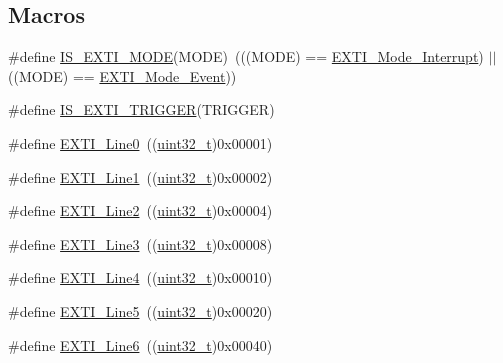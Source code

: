 \subsection*{Macros}
\begin{DoxyCompactItemize}
\item 
\#define \hyperlink{group___e_x_t_i___exported___types_ga8429170f3320b90227f9f5b252c1c5eb}{I\+S\+\_\+\+E\+X\+T\+I\+\_\+\+M\+O\+DE}(M\+O\+DE)~(((M\+O\+DE) == \hyperlink{group___e_x_t_i___exported___types_gad5e69af98dc0dfdf64417adc1cf57929a8c6ccdd7b1bc4872731306537e8c3b42}{E\+X\+T\+I\+\_\+\+Mode\+\_\+\+Interrupt}) $\vert$$\vert$ ((M\+O\+DE) == \hyperlink{group___e_x_t_i___exported___types_gad5e69af98dc0dfdf64417adc1cf57929aa38ef186929ec74786df79877ea124a7}{E\+X\+T\+I\+\_\+\+Mode\+\_\+\+Event}))
\item 
\#define \hyperlink{group___e_x_t_i___exported___types_gaee95ec6288944a6245696896604e509e}{I\+S\+\_\+\+E\+X\+T\+I\+\_\+\+T\+R\+I\+G\+G\+ER}(T\+R\+I\+G\+G\+ER)
\item 
\#define \hyperlink{group___e_x_t_i___lines_gac2a65680200dd5f4f7eab29cd4091a75}{E\+X\+T\+I\+\_\+\+Line0}~((\hyperlink{_p_e___types_8h_a33594304e786b158f3fb30289278f5af}{uint32\+\_\+t})0x00001)
\item 
\#define \hyperlink{group___e_x_t_i___lines_gae7c6ab2a0880ce3810641ee0585104cd}{E\+X\+T\+I\+\_\+\+Line1}~((\hyperlink{_p_e___types_8h_a33594304e786b158f3fb30289278f5af}{uint32\+\_\+t})0x00002)
\item 
\#define \hyperlink{group___e_x_t_i___lines_gaec4189bb2709c8c15a0339d1b0b9865a}{E\+X\+T\+I\+\_\+\+Line2}~((\hyperlink{_p_e___types_8h_a33594304e786b158f3fb30289278f5af}{uint32\+\_\+t})0x00004)
\item 
\#define \hyperlink{group___e_x_t_i___lines_gadea3ef6ab7e8bacc686689de8711b98c}{E\+X\+T\+I\+\_\+\+Line3}~((\hyperlink{_p_e___types_8h_a33594304e786b158f3fb30289278f5af}{uint32\+\_\+t})0x00008)
\item 
\#define \hyperlink{group___e_x_t_i___lines_gab33b1fe19306e9e60f8f8d0928b800be}{E\+X\+T\+I\+\_\+\+Line4}~((\hyperlink{_p_e___types_8h_a33594304e786b158f3fb30289278f5af}{uint32\+\_\+t})0x00010)
\item 
\#define \hyperlink{group___e_x_t_i___lines_ga6b4c6292e3abd521cab2bf99d37a15c6}{E\+X\+T\+I\+\_\+\+Line5}~((\hyperlink{_p_e___types_8h_a33594304e786b158f3fb30289278f5af}{uint32\+\_\+t})0x00020)
\item 
\#define \hyperlink{group___e_x_t_i___lines_ga97a5145d1d2612dd53bdd9db3d366873}{E\+X\+T\+I\+\_\+\+Line6}~((\hyperlink{_p_e___types_8h_a33594304e786b158f3fb30289278f5af}{uint32\+\_\+t})0x00040)
$$
\end{DoxyCompactItemize}
